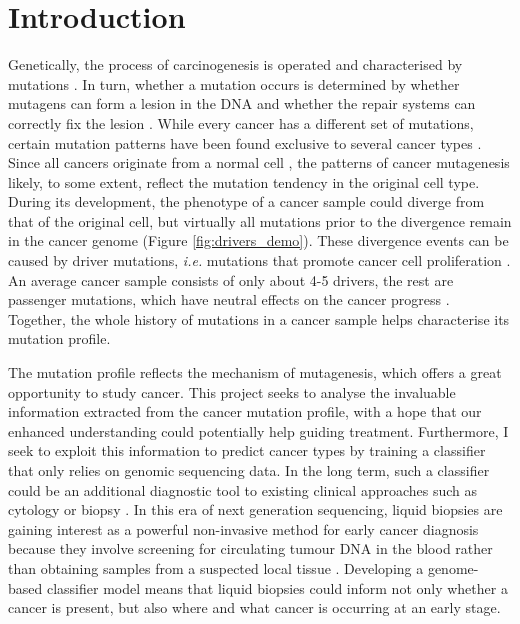 \chapter{Introduction}\label{intro}

Genetically, the process of \gls{carcinogenesis} is operated and characterised by mutations \citep{Stratton2009}. In turn, whether a mutation occurs is determined by whether mutagens can form a \gls{lesion} in the DNA and whether the repair systems can correctly fix the lesion \citep{Chatterjee2017MechanismsMutagenesis}. While every cancer has a different set of mutations, certain mutation patterns have been found exclusive to several cancer types \citep{Alexandrov2013,Polak2015,Campbell2020}. Since all cancers originate from a normal cell \citep{Hanahan2011HallmarksGeneration}, the patterns of cancer \gls{mutagenesis} likely, to some extent, reflect the mutation tendency in the original cell type. During its development, the phenotype of a cancer sample could diverge from that of the original cell, but virtually all mutations prior to the divergence remain in the cancer genome (Figure \ref{fig:drivers_demo}). These divergence events can be caused by driver mutations, \textit{i.e.} mutations that promote cancer cell proliferation \citep{Pon2015}. An average cancer sample consists of only about 4-5 drivers, the rest are passenger mutations, which have neutral effects on the cancer progress \citep{Campbell2020}. Together, the whole history of mutations in a cancer sample helps characterise its mutation profile. 



The mutation profile reflects the mechanism of mutagenesis, which offers a great opportunity to study cancer. This project seeks to analyse the invaluable information extracted from the cancer mutation profile, with a hope that our enhanced understanding could potentially help guiding treatment. Furthermore, I seek to exploit this information to predict cancer types by training a \gls{classifier} that only relies on genomic sequencing data. In the long term, such a classifier could be an additional diagnostic tool to existing clinical approaches such as cytology or biopsy \citep{Stone1995Biopsy:Pitfalls}. In this era of next generation sequencing, liquid biopsies are gaining interest as a powerful non-invasive method for early cancer diagnosis because they involve screening for circulating tumour DNA in the blood rather than obtaining samples from a suspected local tissue \citep{Chen2019Next-generationDetection}. Developing a genome-based classifier model means that liquid biopsies could inform not only whether a cancer is present, but also where and what cancer is occurring at an early stage.  

